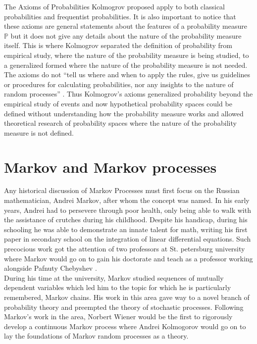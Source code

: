 \documentclass{article}
\begin{document}
The Axioms of Probabilities Kolmogrov proposed apply to both classical probabilities and frequentist probabilities. It is also important to notice that these axioms are general statements about the features of a probability measure $\mathbb{P}$ but it does not give any details about the nature of the probability measure itself. This is where Kolmogrov separated the definition of probability from empirical study, where the nature of the probability measure is being studied, to a generalized formed where the nature of the probability measure is not needed. The axioms do not ``tell us where and when to apply the rules, give us guidelines or procedures for calculating probabilities, nor any insights to the nature of random processes'' \parencite{Glen2020}. Thus Kolmogrov's axioms generalized probability beyond the empirical study of events and now hypothetical probability spaces could be defined without understanding how the probability measure works and allowed theoretical research of probability spaces where the nature of the probability measure is not defined.
\section{Markov and Markov processes}
Any historical discussion of Markov Processes must first focus on the Russian mathematician, Andrei Markov, after whom the concept was named. In his early years, Andrei had to persevere through poor health, only being able to walk with the assistance of crutches during his childhood. Despite his handicap, during his schooling he was able to demonstrate an innate talent for math, writing his first paper in secondary school on the integration of linear differential equations. Such precocious work got the attention of two professors at St. petersburg university where Markov would go on to gain his doctorate and teach as a professor working alongside Pafnuty Chebyshev \parencite{OConnor2006}.  \\

During his time at the university, Markov studied sequences of mutually dependent variables which led him to the topic for which he is particularly remembered, Markov chains. His work in this area gave way to a novel branch of probability theory and preempted the theory of stochastic processes. Following Markov’s work in the area, Norbert Wiener would be the first to rigorously develop a continuous Markov process where Andrei Kolmogorov would go on to lay the foundations of Markov random processes as a theory. \\
\end{document}
